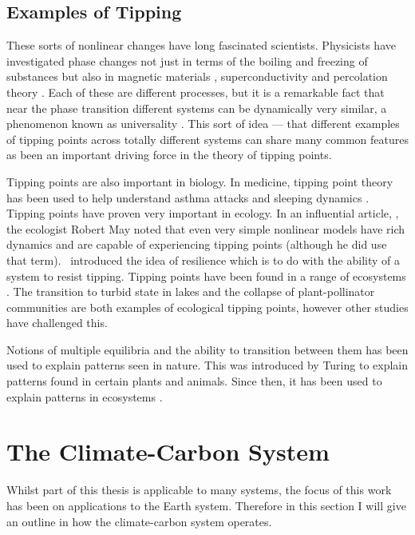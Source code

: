 \subsection{Examples of Tipping}

These sorts of nonlinear changes have long fascinated scientists. Physicists have investigated phase changes not just in terms of the boiling and freezing of substances but also
in magnetic materials \parencite{Ising1925,Onsager1944}, superconductivity \parencite{Landau1965} and percolation theory \parencite{Flory1941}. Each of these are different processes, but it is a
remarkable fact that near the phase transition different systems can be dynamically very similar, a phenomenon known as universality \parencite{Wilson1983}. This sort of idea --- that different examples
of tipping points across totally different systems can share many common features as been an important driving force in the theory of tipping points. 

Tipping points are also important in biology. In medicine, tipping point theory has been used to help understand asthma attacks \parencite{Donovan2022} and sleeping dynamics \parencite{Skeldon2014}.
Tipping points have proven very important in ecology. In an influential article, \parencite{May1976}, the ecologist Robert May noted that even very simple nonlinear models have rich dynamics and are capable
of experiencing tipping points (although he did use that term).~\cite{Holling1973} introduced the idea of resilience which is to do with the ability of a system to resist tipping. Tipping points have
been found in a range of ecosystems \parencite{Scheffer2001,Dakos2019}. The transition to turbid state in lakes \parencite{Scheffer1993} and the collapse of plant-pollinator communities
\parencite{Lever2014} are both examples of ecological tipping points, however other studies \parencite{Hillebrand2020} have challenged this.

Notions of multiple equilibria and the ability to transition between them has been used to explain patterns seen in nature. This was introduced by Turing \parencite{Turing1952} to explain
patterns found in certain plants and animals. Since then, it has been used to explain patterns in ecosystems \parencite{Rietkerk2008}.

\section{The Climate-Carbon System}

Whilst part of this thesis is applicable to many systems, the focus of this work has been on applications to the Earth system. Therefore in this section I will give an outline in
how the climate-carbon system operates.

